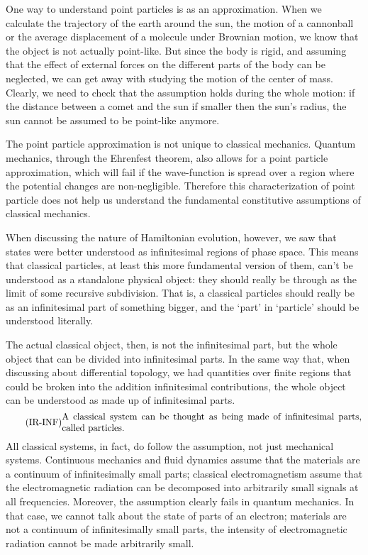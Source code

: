 One way to understand point particles is as an approximation. When we calculate the trajectory of the earth around the sun, the motion of a cannonball or the average displacement of a molecule under Brownian motion, we know that the object is not actually point-like. But since the body is rigid, and assuming that the effect of external forces on the different parts of the body can be neglected, we can get away with studying the motion of the center of mass. Clearly, we need to check that the assumption holds during the whole motion: if the distance between a comet and the sun if smaller then the sun's radius, the sun cannot be assumed to be point-like anymore.

The point particle approximation is not unique to classical mechanics. Quantum mechanics, through the Ehrenfest theorem, also allows for a point particle approximation, which will fail if the wave-function is spread over a region where the potential changes are non-negligible. Therefore this characterization of point particle does not help us understand the fundamental constitutive assumptions of classical mechanics.

When discussing the nature of Hamiltonian evolution, however, we saw that states were better understood as infinitesimal regions of phase space. This means that classical particles, at least this more fundamental version of them, can't be understood as a standalone physical object: they should really be through as the limit of some recursive subdivision. That is, a classical particles should really be as an infinitesimal part of something bigger, and the `part' in `particle' should be understood literally.

The actual classical object, then, is not the infinitesimal part, but the whole object that can be divided into infinitesimal parts. In the same way that, when discussing about differential topology, we had quantities over finite regions that could be broken into the addition infinitesimal contributions, the whole object can be understood as made up of infinitesimal parts.
\begin{equation}\tag{IR-INF}\label{rp-cm-ir-condMadeOfInfinitesimalParts}
	\eqtext{A classical system can be thought as being made of infinitesimal parts, called particles.}
\end{equation}
All classical systems, in fact, do follow the assumption, not just mechanical systems. Continuous mechanics and fluid dynamics assume that the materials are a continuum of infinitesimally small parts; classical electromagnetism assume that the electromagnetic radiation can be decomposed into arbitrarily small signals at all frequencies. Moreover, the assumption clearly fails in quantum mechanics. In that case, we cannot talk about the state of parts of an electron; materials are not a continuum of infinitesimally small parts, the intensity of electromagnetic radiation cannot be made arbitrarily small.

